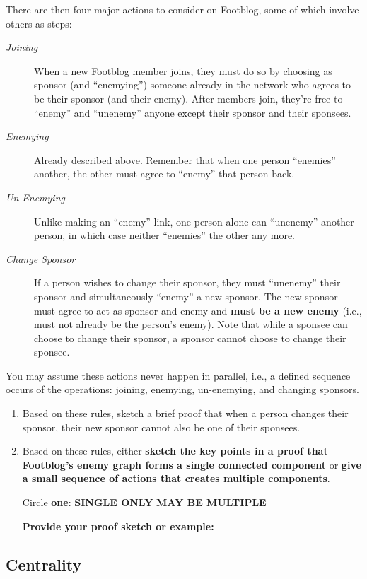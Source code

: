\documentclass[11pt, oneside]{article}   	%
\theoremstyle{definition}
\theoremstyle{remark}
\begin{document}
There are then four major actions to consider on Footblog, some of
which involve others as steps:
\begin{description}
\item[\emph{Joining}] When a new Footblog member joins, they must do so by
               choosing as sponsor (and ``enemying'') someone already in
               the network who agrees to be their sponsor (and their
               enemy). After members join, they're free to ``enemy''
               and ``unenemy'' anyone except their sponsor and their
               sponsees.
\item[\emph{Enemying}] Already described above. Remember that when one person
                ``enemies'' another, the other must agree to ``enemy''
                that person back.
\item[\emph{Un-Enemying}] Unlike making an ``enemy'' link, one person alone can
                   ``unenemy'' another person, in which case neither
                   ``enemies'' the other any more.
\item[\emph{Change Sponsor}] If a person wishes to change their sponsor, they
     must ``unenemy'' their sponsor and simultaneously ``enemy'' a new
     sponsor. The new sponsor must agree to act as sponsor and enemy
     and \textbf{must be a new enemy} (i.e., must not already be the person's
     enemy). Note that while a sponsee can choose to change their
     sponsor, a sponsor cannot choose to change their sponsee.
\end{description}

You may assume these actions never happen in parallel, i.e., a defined
sequence occurs of the operations: joining, enemying, un-enemying, and
changing sponsors.
\begin{enumerate}
\item Based on these rules, sketch a brief proof that when a person
   changes their sponsor, their new sponsor cannot also be one of
   their sponsees.
\item Based on these rules, either \textbf{sketch the key points in a proof that    Footblog's enemy graph forms a single connected component} or \textbf{give    a small sequence of actions that creates multiple components}.
   
   Circle \textbf{one}: \hfill \textbf{SINGLE ONLY} \hfill \textbf{MAY BE MULTIPLE} \hfill

   \textbf{Provide your proof sketch or example:}
\end{enumerate}
\subsection{Centrality}
\end{document}
